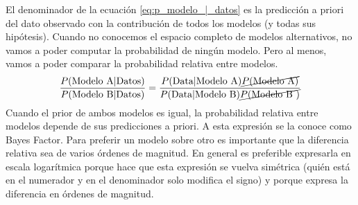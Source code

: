 \documentclass[a4paper,11pt]{book}
\theoremstyle{definition}
\begin{document}
El denominador de la ecuaci\'on \ref{eq:p_modelo_|_datos} es la predicci\'on a priori del dato observado con la contribuci\'on de todos los modelos (y todas sus hip\'otesis).
%
Cuando no conocemos el espacio completo de modelos alternativos, no vamos a poder computar la probabilidad de ning\'un modelo.
%
Pero al menos, vamos a poder comparar la probabilidad relativa entre modelos.
%
 \begin{equation}
\begin{split}
 \frac{P(\text{Modelo A}|\text{Datos})}{P(\text{Modelo B}|\text{Datos})} = \frac{P(\text{Data}|\text{Modelo A})\cancel{P(\text{Modelo A})}}{P(\text{Data}|\text{Modelo B})\cancel{P(\text{Modelo B })}}
\end{split}
\end{equation}
%
Cuando el prior de ambos modelos es igual, la probabilidad relativa entre modelos depende de sus predicciones a priori.
%
A esta expresi\'on se la conoce como Bayes Factor.
%
Para preferir un modelo sobre otro es importante que la diferencia relativa sea de varios \'ordenes de magnitud.
%
En general es preferible expresarla en escala logar\'itmica porque hace que esta expresi\'on se vuelva sim\'etrica (qui\'en est\'a en el numerador y en el denominador solo modifica el signo) y porque expresa la diferencia en \'ordenes de magnitud.

\end{document}
